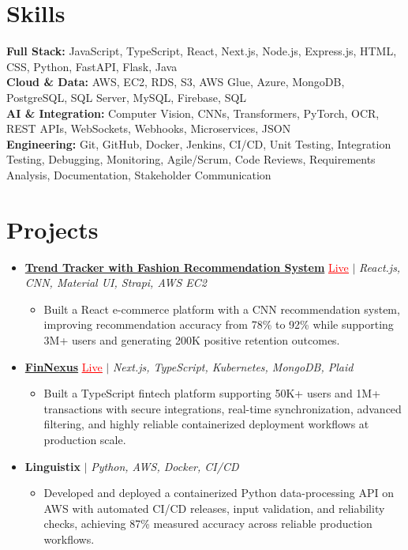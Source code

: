 \documentclass[letterpaper,10pt]{article}
\newcommand{\itemTail}{\vspace{-4pt}}
\newcommand{\sectionGap}{\vspace{-8pt}}
\newcommand{\projGap}{\vspace{3pt}}
\newcommand{\resumeItem}[1]{\item\small{{#1 \itemTail}}}
\newcommand{\resumeProjectHeading}[1]{\item \small #1 \vspace{-2pt}}
\newcommand{\resumeProjectLink}[2]{\href{#1}{\textcolor{red}{\underline{#2}}}}
\newcommand{\resumeSubHeadingListStart}{\begin{itemize}[leftmargin=0.0in, label={}]}
\newcommand{\resumeSubHeadingListEnd}{\end{itemize}}
\newcommand{\resumeProjItemListStart}{\begin{itemize}[leftmargin=0.15in,label=\textbullet,itemsep=3pt,topsep=0pt,parsep=0pt,partopsep=0pt]}
\newcommand{\resumeProjItemListEnd}{\end{itemize}\vspace{-4pt}}
\begin{document}
\section{Skills}
\begin{itemize}[leftmargin=0.15in, label={}]
\small{\item{
\textbf{Full Stack:} JavaScript, TypeScript, React, Next.js, Node.js, Express.js, HTML, CSS, Python, FastAPI, Flask, Java \\
\textbf{Cloud \& Data:} AWS, EC2, RDS, S3, AWS Glue, Azure, MongoDB, PostgreSQL, SQL Server, MySQL, Firebase, SQL \\
\textbf{AI \& Integration:} Computer Vision, CNNs, Transformers, PyTorch, OCR, REST APIs, WebSockets, Webhooks, Microservices, JSON \\
\textbf{Engineering:} Git, GitHub, Docker, Jenkins, CI/CD, Unit Testing, Integration Testing, Debugging, Monitoring, Agile/Scrum, Code Reviews, Requirements Analysis, Documentation, Stakeholder Communication
}}
\end{itemize}
\sectionGap
\section{Projects}
\resumeSubHeadingListStart
\vspace{-2pt}
\resumeProjectHeading{\href{https://www.vastrado.com/}{\textbf{Trend Tracker with Fashion Recommendation System}} \resumeProjectLink{https://www.vastrado.com/}{Live} $|$ \emph{React.js, CNN, Material UI, Strapi, AWS EC2}}
\resumeProjItemListStart
\resumeItem{Built a React e-commerce platform with a CNN recommendation system, improving recommendation accuracy from 78\% to 92\% while supporting 3M+ users and generating 200K positive retention outcomes.}
\resumeProjItemListEnd
\projGap
\resumeProjectHeading{\href{https://fin-nexus.vercel.app/}{\textbf{FinNexus}} \resumeProjectLink{https://fin-nexus.vercel.app/}{Live} $|$ \emph{Next.js, TypeScript, Kubernetes, MongoDB, Plaid}}
\resumeProjItemListStart
\resumeItem{Built a TypeScript fintech platform supporting 50K+ users and 1M+ transactions with secure integrations, real-time synchronization, advanced filtering, and highly reliable containerized deployment workflows at production scale.}
\resumeProjItemListEnd
\projGap
\resumeProjectHeading{\textbf{Linguistix} $|$ \emph{Python, AWS, Docker, CI/CD}}
\resumeProjItemListStart
\resumeItem{Developed and deployed a containerized Python data-processing API on AWS with automated CI/CD releases, input validation, and reliability checks, achieving 87\% measured accuracy across reliable production workflows.}
\resumeProjItemListEnd
\resumeSubHeadingListEnd
\end{document}
